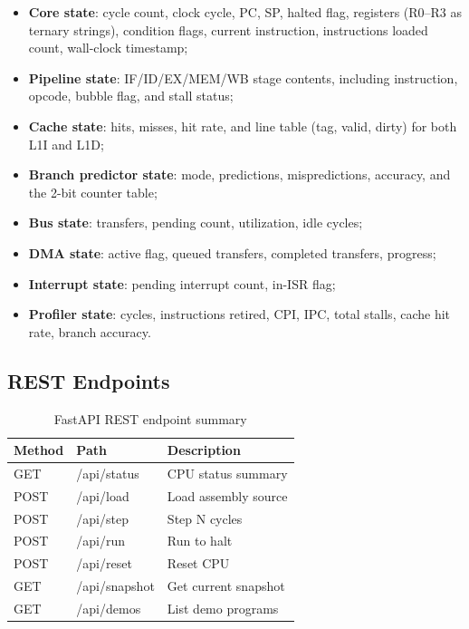 \documentclass[12pt,a4paper,twoside]{book}
\theoremstyle{trinarytheorem}
\theoremstyle{trinarydefinition}
\newcommand{\code}[1]{\textsf{#1}}
\begin{document}
\begin{itemize}
    \item \textbf{Core state}: cycle count, clock cycle, PC, SP, halted
          flag, registers (R0--R3 as ternary strings), condition flags,
          current instruction, instructions loaded count, wall-clock
          timestamp;
    \item \textbf{Pipeline state}: IF/ID/EX/MEM/WB stage contents,
          including instruction, opcode, bubble flag, and stall status;
    \item \textbf{Cache state}: hits, misses, hit rate, and line table
          (tag, valid, dirty) for both L1I and L1D;
    \item \textbf{Branch predictor state}: mode, predictions,
          mispredictions, accuracy, and the 2-bit counter table;
    \item \textbf{Bus state}: transfers, pending count, utilization,
          idle cycles;
    \item \textbf{DMA state}: active flag, queued transfers, completed
          transfers, progress;
    \item \textbf{Interrupt state}: pending interrupt count, in-ISR flag;
    \item \textbf{Profiler state}: cycles, instructions retired, CPI,
          IPC, total stalls, cache hit rate, branch accuracy.
\end{itemize}

\subsection{REST Endpoints}

\begin{table}[H]
\centering
\caption{FastAPI REST endpoint summary}
\label{tab:restendpoints}
\begin{tabular}{lll}
\toprule
Method & Path & Description \\
\midrule
GET  & \code{/api/status}  & CPU status summary \\
POST & \code{/api/load}    & Load assembly source \\
POST & \code{/api/step}    & Step N cycles \\
POST & \code{/api/run}     & Run to halt \\
POST & \code{/api/reset}   & Reset CPU \\
GET  & \code{/api/snapshot}& Get current snapshot \\
GET  & \code{/api/demos}   & List demo programs \\
\bottomrule
\end{tabular}
\end{table}
\end{document}
